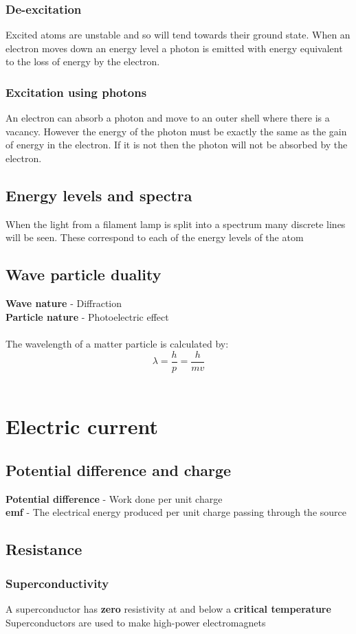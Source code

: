 \documentclass{article}[18pt]
\begin{document}
\subsubsection{De-excitation}
Excited atoms are unstable and so will tend towards their ground state. When an electron moves down an energy level a photon is emitted with energy equivalent to the loss of energy by the electron.
\subsubsection{Excitation using photons}
An electron can absorb a photon and move to an outer shell where there is a vacancy. However the energy of the photon must be exactly the same as the gain of energy in the electron. If it is not then the photon will not be absorbed by the electron.
\subsection{Energy levels and spectra}
When the light from a filament lamp is split into a spectrum many discrete lines will be seen. These correspond to each of the energy levels of the atom
\subsection{Wave particle duality}
\textbf{Wave nature} - Diffraction\\
\textbf{Particle nature} - Photoelectric effect\\
\\
The wavelength of a matter particle is calculated by:
$$\lambda=\dfrac{h}{p}=\dfrac{h}{mv}$$\\
\section{Electric current}
\subsection{Potential difference and charge}
\textbf{Potential difference} - Work done per unit charge\\
\textbf{emf} - The electrical energy produced per unit charge passing through the source
\subsection{Resistance}
\subsubsection{Superconductivity}
A superconductor has \textbf{zero} resistivity at and below a \textbf{critical temperature}\\
Superconductors are used to make high-power electromagnets
\end{document}
